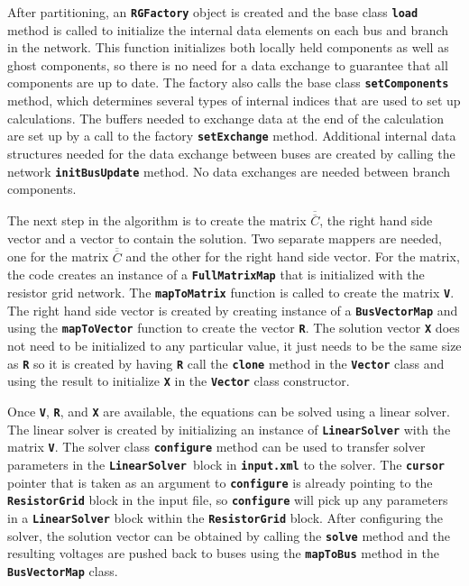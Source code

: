 After partitioning, an \texttt{\textbf{RGFactory}} object is created and the base class \texttt{\textbf{load}} method is called to initialize the internal data elements on each bus and branch in the network. This function initializes both locally held components as well as ghost components, so there is no need for a data exchange to guarantee that all components are up to date. The factory also calls the base class \texttt{\textbf{setComponents}} method, which determines several types of internal indices that are used to set up calculations. The buffers needed to exchange data at the end of the calculation are set up by a call to the factory \texttt{\textbf{setExchange}} method. Additional internal data structures needed for the data exchange between buses are created by calling the network \texttt{\textbf{initBusUpdate}} method. No data exchanges are needed between branch components.

The next step in the algorithm is to create the matrix $\overline{\overline{C}}$, the right hand side vector and a vector to contain the solution. Two separate mappers are needed, one for the matrix $\overline{\overline{C}}$ and the other for the right hand side vector. For the matrix, the code creates an instance of a \texttt{\textbf{FullMatrixMap}} that is initialized with the resistor grid network. The \texttt{\textbf{mapToMatrix}} function is called to create the matrix \texttt{\textbf{V}}. The right hand side vector is created by creating instance of a \texttt{\textbf{BusVectorMap}} and using the \texttt{\textbf{mapToVector}} function to create the vector \texttt{\textbf{R}}. The solution vector \texttt{\textbf{X}} does not need to be initialized to any particular value, it just needs to be the same size as \texttt{\textbf{R}} so it is created by having \texttt{\textbf{R}} call the \texttt{\textbf{clone}} method in the \texttt{\textbf{Vector}} class and using the result to initialize \texttt{\textbf{X}} in the \texttt{\textbf{Vector}} class constructor.

Once \texttt{\textbf{V}}, \texttt{\textbf{R}}, and \texttt{\textbf{X}} are available, the equations can be solved using a linear solver. The linear solver is created by initializing an instance of \texttt{\textbf{LinearSolver}} with the matrix \texttt{\textbf{V}}. The solver class \texttt{\textbf{configure}} method can be used to transfer solver parameters in the \texttt{\textbf{LinearSolver }}block in \texttt{\textbf{input.xml}} to the solver. The \texttt{\textbf{cursor}} pointer  that is taken as an argument to \texttt{\textbf{configure}} is already pointing to the \texttt{\textbf{ResistorGrid}} block in the input file, so \texttt{\textbf{configure}} will pick up any parameters in a \texttt{\textbf{LinearSolver}} block within the \texttt{\textbf{ResistorGrid}} block. After configuring the solver, the solution vector can be obtained by calling the \texttt{\textbf{solve}} method and the resulting voltages are pushed back to buses using the \texttt{\textbf{mapToBus}} method in the \texttt{\textbf{BusVectorMap}} class.

